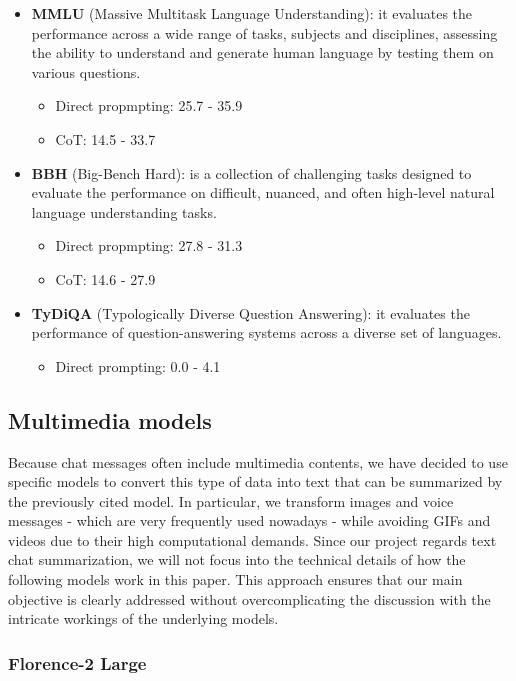 \documentclass[10pt,twocolumn,letterpaper]{article}
\begin{document}
\begin{itemize}
    \item \textbf{MMLU} (Massive Multitask Language Understanding): it evaluates the performance across a wide range of tasks, subjects and disciplines, assessing the ability to understand and generate human language by testing them on various questions.
    \begin{itemize}
        \item Direct propmpting: 25.7 - 35.9
        \item CoT: 14.5 - 33.7
    \end{itemize}
    \item \textbf{BBH} (Big-Bench Hard): is a collection of challenging tasks designed to evaluate the performance on difficult, nuanced, and often high-level natural language understanding tasks. 
    \begin{itemize}
        \item Direct propmpting: 27.8 - 31.3
        \item CoT: 14.6 - 27.9
    \end{itemize}
    \item \textbf{TyDiQA} (Typologically Diverse Question Answering): it evaluates the performance of question-answering systems across a diverse set of languages.
    \begin{itemize}
        \item Direct prompting: 0.0 - 4.1
    \end{itemize}
\end{itemize}

\subsection{Multimedia models}

Because chat messages often include multimedia contents, we have decided to use specific models to convert this type of data into text that can be summarized by the previously cited model. In particular, we transform images and voice messages - which are very frequently used nowadays - while avoiding GIFs and videos due to their high computational demands. 
Since our project regards text chat summarization, we will not focus into the technical details of how the following models work in this paper. This approach ensures that our main objective is clearly addressed without overcomplicating the discussion with the intricate workings of the underlying models.

\subsubsection{Florence-2 Large}
\end{document}
